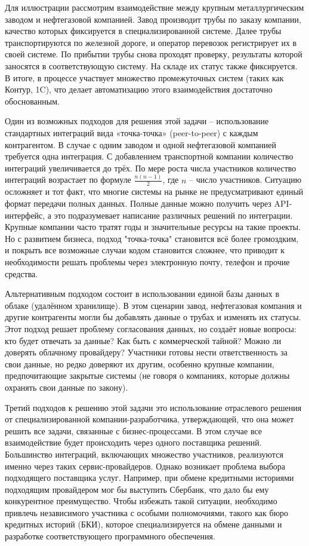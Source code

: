Для иллюстрации рассмотрим взаимодействие между крупным металлургическим заводом и нефтегазовой компанией. Завод производит трубы по заказу компании, качество которых фиксируется в специализированной системе. Далее трубы транспортируются по железной дороге, и оператор перевозок регистрирует их в своей системе. По прибытии трубы снова проходят проверку, результаты которой заносятся в соответствующую систему. На складе их статус также фиксируется. В итоге, в процессе участвует множество промежуточных систем (таких как Контур, 1C), что делает автоматизацию этого взаимодействия достаточно обоснованным.

Один из возможных подходов для решения этой задачи -- использование стандартных интеграций вида «точка-точка» (peer-to-peer) с каждым контрагентом. В случае с одним заводом и одной нефтегазовой компанией требуется одна интеграция. С добавлением транспортной компании количество интеграций увеличивается до трёх. По мере роста числа участников количество интеграций возрастает по формуле $ \frac{n(n-1)}{2} $, где $ n $ -- число участников. Ситуацию осложняет и тот факт, что многие системы на рынке не предусматривают единый формат передачи полных данных. Полные данные можно получить через API-интерфейс, а это подразумевает написание различных решений по интеграции. Крупные компании часто тратят годы и значительные ресурсы на такие проекты. Но с развитием бизнеса, подход "точка-точка" становится всё более громоздким, и покрыть все возможные случаи кодом становится сложнее, что приводит к необходимости решать проблемы через электронную почту, телефон и прочие средства.

Альтернативным подходом состоит в использовании единой базы данных в облаке (удалённом хранилище). В этом сценарии завод, нефтегазовая компания и другие контрагенты могли бы добавлять данные о трубах и изменять их статусы. Этот подход решает проблему согласования данных, но создаёт новые вопросы: кто будет отвечать за данные? Как быть с коммерческой тайной? Можно ли доверять облачному провайдеру? Участники готовы нести ответственность за свои данные, но редко доверяют их другим, особенно крупные компании, предпочитающие закрытые системы (не говоря о компаниях, которые должны охранять свои данные по закону).

Третий подходов к решению этой задачи это использование отраслевого решения от специализированной компании-разработчика, утверждающей, что она может решить все задачи, связанные с бизнес-процессами. В этом случае все взаимодействие будет происходить через одного поставщика решений. Большинство интеграций, включающих множество участников, реализуются именно через таких сервис-провайдеров. Однако возникает проблема выбора подходящего поставщика услуг. Например, при обмене кредитными историями подходящим провайдером мог бы выступить Сбербанк, что дало бы ему конкурентное преимущество. Чтобы избежать такой ситуации, необходимо привлечь независимого участника с особыми полномочиями, такого как бюро кредитных историй (БКИ), которое специализируется на обмене данными и разработке соответствующего программного обеспечения.

